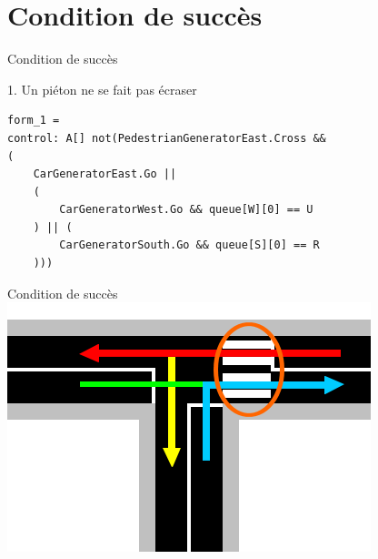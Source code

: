 \documentclass{bredelebeamer}
\begin{document}
\section{Condition de succès}
\begin{frame}[fragile]{Condition de succès}
\begin{block}{1. Un piéton ne se fait pas écraser}
\begin{verbatim}
form_1 = 
control: A[] not(PedestrianGeneratorEast.Cross && 
(
    CarGeneratorEast.Go || 
    (
        CarGeneratorWest.Go && queue[W][0] == U
    ) || (
        CarGeneratorSouth.Go && queue[S][0] == R
    )))
\end{verbatim}
\end{block}

\end{frame}
\begin{frame}[fragile]{Condition de succès}
\centering
\includegraphics[scale=0.8]{images/pietonCollision.png}

\end{frame}
\end{document}
